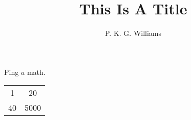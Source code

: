 \documentclass{article}
\title{This Is A Title}
\author{P. K. G. Williams}
\begin{document}
Ping $a$ math.

\begin{tabular}{cc}
1 & 20 \\
40 & 5000
\end{tabular}
\end{document}
